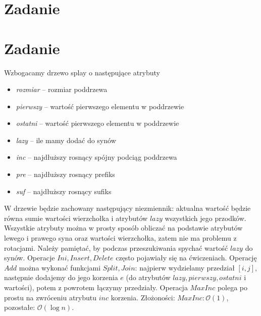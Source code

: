 \documentclass[12pt, a4paper]{article}
\newcommand{\MCALO}{\mathcal{O}}
\newcounter{zadanie}
\newcommand{\zadanie}{\addtocounter{zadanie}{1}\section*{Zadanie \arabic{zadanie}}}
\begin{document}
\zadanie{}

\zadanie{}
Wzbogacamy drzewo splay o następujące atrybuty
\begin{itemize}
  \item \textit{rozmiar} -- rozmiar poddrzewa
  \item \textit{pierwszy} -- wartość pierwszego elementu w poddrzewie
  \item \textit{ostatni} -- wartość pierwszego elementu w poddrzewie
  \item \textit{lazy} -- ile mamy dodać do synów
  \item \textit{inc} -- najdłuższy rosnący spójny podciąg poddrzewa
  \item \textit{pre} -- najdłuższy rosnący prefiks
  \item \textit{suf} -- najdłuższy rosnący sufiks
\end{itemize}
W drzewie będzie zachowany następujący niezmiennik: aktualna wartość będzie
równa sumie wartości wierzchołka i atrybutów $\mathit{lazy}$ wszystkich jego
przodków. Wszystkie atrybuty można w prosty sposób obliczać na podstawie
atrybutów lewego i prawego syna oraz wartości wierzchołka, zatem nie ma
problemu z rotacjami. Należy pamiętać, by podczas przeszukiwania spychać
wartość $lazy$ do synów. Operacje $\mathit{Ini, Insert, Delete}$ często
pojawiały się na ćwiczeniach. Operację $\mathit{Add}$ można wykonać funkcjami
$\mathit{Split, Join}$: najpierw wydzielamy przedział $[i,j]$, następnie
dodajemy do jego korzenia $e$ (do atrybutów $\mathit{lazy,pierwszy,ostatni}$
i wartości), potem z powrotem łączymy przedziały. Operacja $\mathit{MaxInc}$
polega po prostu na zwróceniu atrybutu $\mathit{inc}$ korzenia. Złożoności:
$\mathit{MaxInc}: \MCALO(1)$, pozostałe: $\MCALO(\log{n})$.
\end{document}
